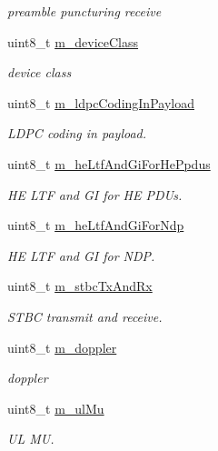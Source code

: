 \begin{DoxyCompactItemize}
\begin{DoxyCompactList}\small\item\em preamble puncturing receive \end{DoxyCompactList}\item 
uint8\+\_\+t \hyperlink{classns3_1_1HeCapabilities_aac04f89c46b6cf874ea55f9c8217d778}{m\+\_\+device\+Class}
\begin{DoxyCompactList}\small\item\em device class \end{DoxyCompactList}\item 
uint8\+\_\+t \hyperlink{classns3_1_1HeCapabilities_a536bed2c74547655822291fe6201ee8c}{m\+\_\+ldpc\+Coding\+In\+Payload}
\begin{DoxyCompactList}\small\item\em L\+D\+PC coding in payload. \end{DoxyCompactList}\item 
uint8\+\_\+t \hyperlink{classns3_1_1HeCapabilities_ac0d27f9b4d2a8c9de09e5d5382998ddd}{m\+\_\+he\+Ltf\+And\+Gi\+For\+He\+Ppdus}
\begin{DoxyCompactList}\small\item\em HE L\+TF and GI for HE P\+D\+Us. \end{DoxyCompactList}\item 
uint8\+\_\+t \hyperlink{classns3_1_1HeCapabilities_abf0323f232fa7a83f7450fc025d73162}{m\+\_\+he\+Ltf\+And\+Gi\+For\+Ndp}
\begin{DoxyCompactList}\small\item\em HE L\+TF and GI for N\+DP. \end{DoxyCompactList}\item 
uint8\+\_\+t \hyperlink{classns3_1_1HeCapabilities_a8aab94e87c6737a9c43b8d08dfdcd93b}{m\+\_\+stbc\+Tx\+And\+Rx}
\begin{DoxyCompactList}\small\item\em S\+T\+BC transmit and receive. \end{DoxyCompactList}\item 
uint8\+\_\+t \hyperlink{classns3_1_1HeCapabilities_abcc2b218c56f4d0b84cd4ea433cde69f}{m\+\_\+doppler}
\begin{DoxyCompactList}\small\item\em doppler \end{DoxyCompactList}\item 
uint8\+\_\+t \hyperlink{classns3_1_1HeCapabilities_a5e00ff194cfcfb5ea4f7f7262db519a9}{m\+\_\+ul\+Mu}
\begin{DoxyCompactList}\small\item\em UL MU. \end{DoxyCompactList}\item 

\end{DoxyCompactItemize}
